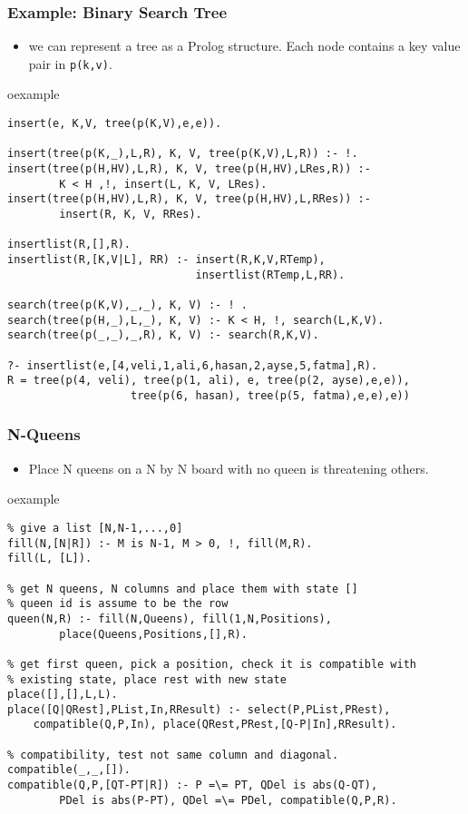 \begin{frame}[fragile]
\frametitle{Example: Binary Search Tree}
\small
\begin{itemize}
\item we can represent a tree as a Prolog structure. Each
node contains a key value pair in \lstinline!p(k,v)!.
\end{itemize}
\begin{beamercolorbox}{oexample}
\begin{lstlisting}[basicstyle=\scriptsize\ttfamily]
insert(e, K,V, tree(p(K,V),e,e)).

insert(tree(p(K,_),L,R), K, V, tree(p(K,V),L,R)) :- !.
insert(tree(p(H,HV),L,R), K, V, tree(p(H,HV),LRes,R)) :- 
        K < H ,!, insert(L, K, V, LRes).
insert(tree(p(H,HV),L,R), K, V, tree(p(H,HV),L,RRes)) :-
        insert(R, K, V, RRes).

insertlist(R,[],R).
insertlist(R,[K,V|L], RR) :- insert(R,K,V,RTemp), 
                             insertlist(RTemp,L,RR).

search(tree(p(K,V),_,_), K, V) :- ! .
search(tree(p(H,_),L,_), K, V) :- K < H, !, search(L,K,V).
search(tree(p(_,_),_,R), K, V) :- search(R,K,V).

?- insertlist(e,[4,veli,1,ali,6,hasan,2,ayse,5,fatma],R).
R = tree(p(4, veli), tree(p(1, ali), e, tree(p(2, ayse),e,e)), 
                   tree(p(6, hasan), tree(p(5, fatma),e,e),e))
\end{lstlisting}
\end{beamercolorbox}
\end{frame}

\begin{frame}[fragile]
\frametitle{N-Queens}
\small
\begin{itemize}
\item Place N queens on a N by N board with
	no queen is threatening others.
\end{itemize}
\begin{beamercolorbox}{oexample}
\begin{lstlisting}
% give a list [N,N-1,...,0]
fill(N,[N|R]) :- M is N-1, M > 0, !, fill(M,R).
fill(L, [L]).

% get N queens, N columns and place them with state []
% queen id is assume to be the row
queen(N,R) :- fill(N,Queens), fill(1,N,Positions),
        place(Queens,Positions,[],R).

% get first queen, pick a position, check it is compatible with
% existing state, place rest with new state
place([],[],L,L).
place([Q|QRest],PList,In,RResult) :- select(P,PList,PRest), 
    compatible(Q,P,In), place(QRest,PRest,[Q-P|In],RResult).

% compatibility, test not same column and diagonal. 
compatible(_,_,[]).
compatible(Q,P,[QT-PT|R]) :- P =\= PT, QDel is abs(Q-QT), 
        PDel is abs(P-PT), QDel =\= PDel, compatible(Q,P,R).
\end{lstlisting}
\end{beamercolorbox}
\end{frame}

